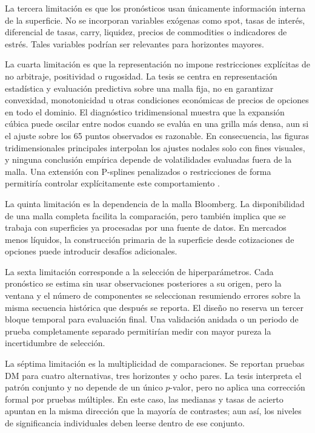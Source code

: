 \documentclass[a4paper,11pt]{article}
\begin{document}
La tercera limitación es que los pronósticos usan únicamente información interna de la superficie. No se incorporan variables exógenas como spot, tasas de interés, diferencial de tasas, carry, liquidez, precios de commodities o indicadores de estrés. Tales variables podrían ser relevantes para horizontes mayores.

La cuarta limitación es que la representación no impone restricciones explícitas de no arbitraje, positividad o rugosidad. La tesis se centra en representación estadística y evaluación predictiva sobre una malla fija, no en garantizar convexidad, monotonicidad u otras condiciones económicas de precios de opciones en todo el dominio. El diagnóstico tridimensional muestra que la expansión cúbica puede oscilar entre nodos cuando se evalúa en una grilla más densa, aun si el ajuste sobre los 65 puntos observados es razonable. En consecuencia, las figuras tridimensionales principales interpolan los ajustes nodales solo con fines visuales, y ninguna conclusión empírica depende de volatilidades evaluadas fuera de la malla. Una extensión con P-splines penalizados o restricciones de forma permitiría controlar explícitamente este comportamiento \cite{EilersMarx1996,Wood2017}.

La quinta limitación es la dependencia de la malla Bloomberg. La disponibilidad de una malla completa facilita la comparación, pero también implica que se trabaja con superficies ya procesadas por una fuente de datos. En mercados menos líquidos, la construcción primaria de la superficie desde cotizaciones de opciones puede introducir desafíos adicionales.

La sexta limitación corresponde a la selección de hiperparámetros. Cada pronóstico se estima sin usar observaciones posteriores a su origen, pero la ventana y el número de componentes se seleccionan resumiendo errores sobre la misma secuencia histórica que después se reporta. El diseño no reserva un tercer bloque temporal para evaluación final. Una validación anidada o un periodo de prueba completamente separado permitirían medir con mayor pureza la incertidumbre de selección.

La séptima limitación es la multiplicidad de comparaciones. Se reportan pruebas DM para cuatro alternativas, tres horizontes y ocho pares. La tesis interpreta el patrón conjunto y no depende de un único \(p\)-valor, pero no aplica una corrección formal por pruebas múltiples. En este caso, las medianas y tasas de acierto apuntan en la misma dirección que la mayoría de contrastes; aun así, los niveles de significancia individuales deben leerse dentro de ese conjunto.
\end{document}
